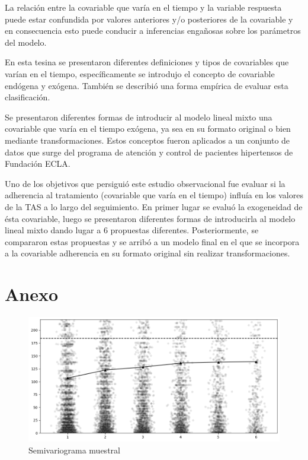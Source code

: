 \documentclass[spanish]{article}
\numberwithin{figure}{subsection}
\numberwithin{equation}{subsection}
\numberwithin{table}{subsection}
\begin{document}
La relación entre la covariable que varía en el tiempo y la variable respuesta
puede estar confundida por valores anteriores y/o posteriores de la covariable y
en consecuencia esto puede conducir a inferencias engañosas sobre los parámetros
del modelo.

En esta tesina se presentaron diferentes definiciones y tipos de covariables que
varían en el tiempo, específicamente se introdujo el concepto de covariable
endógena y exógena. También se describió una forma empírica de evaluar esta
clasificación.

Se presentaron diferentes formas de introducir al modelo lineal mixto una
covariable que varía en el tiempo exógena, ya sea en su formato original o bien
mediante transformaciones. Estos conceptos fueron aplicados a un conjunto de
datos que surge del programa de atención y control de pacientes hipertensos de
Fundación ECLA.

Uno de los objetivos que persiguió este estudio observacional fue evaluar si la
adherencia al tratamiento (covariable que varía en el tiempo) influía en los
valores de la TAS a lo largo del seguimiento. En primer lugar se evaluó la
exogeneidad de ésta covariable, luego se presentaron diferentes formas de
introducirla al modelo lineal mixto dando lugar a 6 propuestas diferentes.
Posteriormente, se compararon estas propuestas y se arribó a un modelo final en
el que se incorpora a la covariable adherencia en su formato original sin
realizar transformaciones.

\newpage

\section{Anexo}

\begin{figure}[H]
	\centering
	\includegraphics[scale=0.4]{img/semivariogram.png}
	\caption{Semivariograma muestral}
	\label{semivariogram}
\end{figure}
\end{document}
